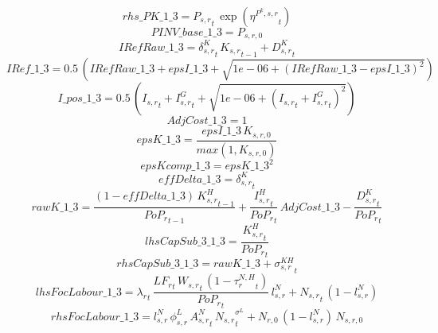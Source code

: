 \begin{dmath*}
rhs\_PK\_1\_3 = {{P_{s,r}}}_{t}\, \exp\left({{\eta^{P^k,s,r}}}_{t}\right)
\end{dmath*}
\begin{dmath*}
PINV\_base\_1\_3 = {{P_{s,r,0}}}
\end{dmath*}
\begin{dmath*}
IRefRaw\_1\_3 = {{\delta^{K}_{s,r}}}_{t}\, {{K_{s,r}}}_{t-1}+{{D^K_{s,r}}}_{t}
\end{dmath*}
\begin{dmath*}
IRef\_1\_3 = 0.5\, \left({IRefRaw\_1\_3}+{epsI\_1\_3}+\sqrt{1e-06+\left({IRefRaw\_1\_3}-{epsI\_1\_3}\right)^{2}}\right)
\end{dmath*}
\begin{dmath*}
I\_pos\_1\_3 = 0.5\, \left({{I_{s,r}}}_{t}+{{I^G_{s,r}}}_{t}+\sqrt{1e-06+\left({{I_{s,r}}}_{t}+{{I^G_{s,r}}}_{t}\right)^{2}}\right)
\end{dmath*}
\begin{dmath*}
AdjCost\_1\_3 = 1
\end{dmath*}
\begin{dmath*}
epsK\_1\_3 = \frac{{epsI\_1\_3}\, {{K_{s,r,0}}}}{max(1,{{K_{s,r,0}}})}
\end{dmath*}
\begin{dmath*}
epsKcomp\_1\_3 = {epsK\_1\_3}^{2}
\end{dmath*}
\begin{dmath*}
effDelta\_1\_3 = {{\delta^{K}_{s,r}}}_{t}
\end{dmath*}
\begin{dmath*}
rawK\_1\_3 = \frac{\left(1-{effDelta\_1\_3}\right)\, {{K^H_{s,r}}}_{t-1}}{{{PoP_r}}_{t-1}}+\frac{{{I^H_{s,r}}}_{t}}{{{PoP_r}}_{t}}\, {AdjCost\_1\_3}-\frac{{{D^K_{s,r}}}_{t}}{{{PoP_r}}_{t}}
\end{dmath*}
\begin{dmath*}
lhsCapSub\_3\_1\_3 = \frac{{{K^H_{s,r}}}_{t}}{{{PoP_r}}_{t}}
\end{dmath*}
\begin{dmath*}
rhsCapSub\_3\_1\_3 = {rawK\_1\_3}+{{\sigma^{KH}_{s,r}}}_{t}
\end{dmath*}
\begin{dmath*}
lhsFocLabour\_1\_3 = {\lambda_r}_{t}\, \frac{{{LF_r}}_{t}\, {{W_{s,r}}}_{t}\, \left(1-{{\tau^{N,H}_{r}}}_{t}\right)}{{{PoP_r}}_{t}}\, {{l^{N}_{s,r}}}+{{N_{s,r}}}_{t}\, \left(1-{{l^{N}_{s,r}}}\right)
\end{dmath*}
\begin{dmath*}
rhsFocLabour\_1\_3 = {{l^{N}_{s,r}}}\, {{\phi^{L}_{s,r}}}\, {{A^{N}_{s,r}}}_{t}\, {{N_{s,r}}}_{t}^{{{\sigma^{L}}}}+{{N_{r,0}}}\, \left(1-{{l^{N}_{s,r}}}\right)\, {{N_{s,r,0}}}
\end{dmath*}
